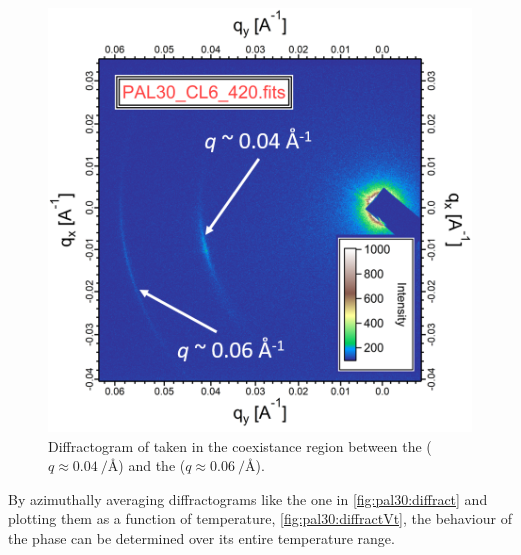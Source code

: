 \documentclass[aagreenthesis]{subfiles}
\begin{document}
\begin{figure}[h!]
    \centering
    \includegraphics[width=.8\textwidth]{figs/pal30/rsoxssm2/RSoXS-coexistanenceDiffracto.png}
    \caption{\label{fig:pal30:diffract} Diffractogram of \nfour{} taken in the
        coexistance region between the \smcpalpha{} ($q\approx
        \SI{0.04}{\per\angstrom}$) and the \smcapa{} ($q\approx
    \SI{0.06}{\per\angstrom}$).}
\end{figure}

By azimuthally averaging diffractograms like the one in
\autoref{fig:pal30:diffract} and plotting them as a function of temperature,
\autoref{fig:pal30:diffractVt}, the
behaviour of the \smcpalpha phase can be determined over its entire temperature
range.
\end{document}
